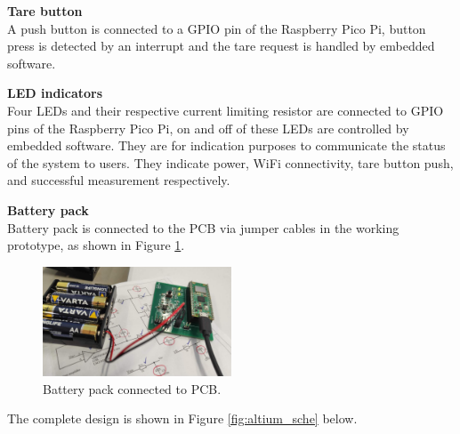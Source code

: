 \textbf{Tare button}\\
A push button is connected to a GPIO pin of the Raspberry Pico Pi, button press is detected by an interrupt and the tare request is handled by embedded software.

\textbf{LED indicators}\\
Four LEDs and their respective current limiting resistor are connected to GPIO pins of the Raspberry Pico Pi, on and off of these LEDs are controlled by embedded software. They are for indication purposes to communicate the status of the system to users. They indicate power, WiFi connectivity, tare button push, and successful measurement respectively.

\textbf{Battery pack}\\
Battery pack is connected to the PCB via jumper cables in the working prototype, as shown in Figure \ref{fig:battery_pack}.

\begin{figure}[h]
    \centering
    \includegraphics[width=0.5\textwidth]{final-report/assets/battery_pack.jpg}
    \caption{Battery pack connected to PCB.}
    \label{fig:battery_pack}
\end{figure}

The complete design is shown in Figure \ref{fig:altium_sche} below.

